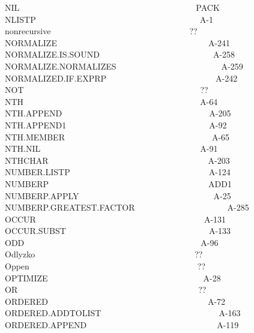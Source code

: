 \documentclass[11pt]{book}
\newenvironment{pubasis}{\begin{flushleft}\ttfamily\small}{\normalsize\rmfamily\end{flushleft}}
\begin{document}
\begin{pubasis}
NIL~~~~~~~~~~~~~~~~~~~~~~~~~~~~~~~~~~~~~~~~~~PACK\\
NLISTP~~~~~~~~~~~~~~~~~~~~~~~~~~~~~~~~~~~~~~~A-1\\
nonrecursive~~~~~~~~~~~~~~~~~~~~~~~~~~~~~~~~~??\\
NORMALIZE~~~~~~~~~~~~~~~~~~~~~~~~~~~~~~~~~~~~A-241\\
NOR\-MAL\-IZE.IS.SOUND~~~~~~~~~~~~~~~~~~~~~~~~~~~A-258\\
NOR\-MAL\-IZE.NOR\-MAL\-IZES~~~~~~~~~~~~~~~~~~~~~~~~~A-259\\
NOR\-MAL\-IZED.IF.EXPRP~~~~~~~~~~~~~~~~~~~~~~~~~~A-242\\
NOT~~~~~~~~~~~~~~~~~~~~~~~~~~~~~~~~~~~~~~~~~~??\\
NTH~~~~~~~~~~~~~~~~~~~~~~~~~~~~~~~~~~~~~~~~~~A-64\\
NTH.APPEND~~~~~~~~~~~~~~~~~~~~~~~~~~~~~~~~~~~A-205\\
NTH.APPEND1~~~~~~~~~~~~~~~~~~~~~~~~~~~~~~~~~~A-92\\
NTH.MEMBER~~~~~~~~~~~~~~~~~~~~~~~~~~~~~~~~~~~A-65\\
NTH.NIL~~~~~~~~~~~~~~~~~~~~~~~~~~~~~~~~~~~~~~A-91\\
NTHCHAR~~~~~~~~~~~~~~~~~~~~~~~~~~~~~~~~~~~~~~A-203\\
NUMBER.LISTP~~~~~~~~~~~~~~~~~~~~~~~~~~~~~~~~~A-124\\
NUMBERP~~~~~~~~~~~~~~~~~~~~~~~~~~~~~~~~~~~~~~ADD1\\
NUMBERP.APPLY~~~~~~~~~~~~~~~~~~~~~~~~~~~~~~~~A-25\\
NUMBERP.GREAT\-EST.FAC\-TOR~~~~~~~~~~~~~~~~~~~~~~A-285\\
OCCUR~~~~~~~~~~~~~~~~~~~~~~~~~~~~~~~~~~~~~~~~A-131\\
OCCUR.SUBST~~~~~~~~~~~~~~~~~~~~~~~~~~~~~~~~~~A-133\\
ODD~~~~~~~~~~~~~~~~~~~~~~~~~~~~~~~~~~~~~~~~~~A-96\\
Odlyzko~~~~~~~~~~~~~~~~~~~~~~~~~~~~~~~~~~~~~~??\\
Oppen~~~~~~~~~~~~~~~~~~~~~~~~~~~~~~~~~~~~~~~~??\\
OPTIMIZE~~~~~~~~~~~~~~~~~~~~~~~~~~~~~~~~~~~~~A-28\\
OR~~~~~~~~~~~~~~~~~~~~~~~~~~~~~~~~~~~~~~~~~~~??\\
ORDERED~~~~~~~~~~~~~~~~~~~~~~~~~~~~~~~~~~~~~~A-72\\
ORDERED.ADD\-TO\-LIST~~~~~~~~~~~~~~~~~~~~~~~~~~~~A-163\\
ORDERED.APPEND~~~~~~~~~~~~~~~~~~~~~~~~~~~~~~~A-119\\

\end{pubasis}
\end{document}
